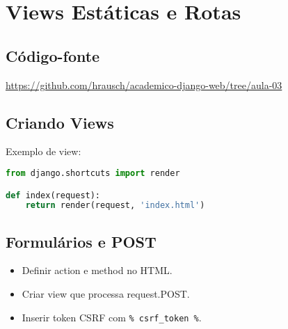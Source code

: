 \chapter{Views Est\'aticas e Rotas}

\section{Código-fonte}
\href{https://github.com/hrausch/academico-django-web/tree/aula-03}{https://github.com/hrausch/academico-django-web/tree/aula-03}
\section{Criando Views}
Exemplo de view:
\begin{lstlisting}[language=Python]
from django.shortcuts import render

def index(request):
    return render(request, 'index.html')
\end{lstlisting}

\section{Formul\'arios e POST}
\begin{itemize}
  \item Definir action e method no HTML.
  \item Criar view que processa request.POST.
  \item Inserir token CSRF com \texttt{{\% csrf\_token \%}}.
\end{itemize}

